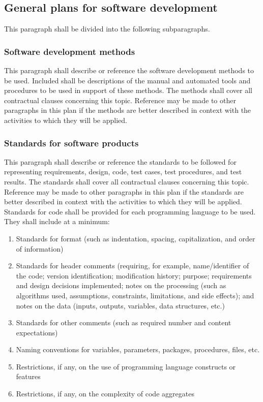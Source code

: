 \subsection{General plans for software development}

This paragraph shall be divided into the following subparagraphs.

\subsubsection{Software development methods}

This paragraph shall describe or reference the software development
methods to be used. Included shall be descriptions of the manual and
automated tools and procedures to be used in support of these methods.
The methods shall cover all contractual clauses concerning this topic.
Reference may be made to other paragraphs in this plan if the methods
are better described in context with the activities to which they will
be applied.

\subsubsection{Standards for software products}

This paragraph shall describe or reference the standards to be followed
for representing requirements, design, code, test cases, test
procedures, and test results. The standards shall cover all contractual
clauses concerning this topic. Reference may be made to other paragraphs
in this plan if the standards are better described in context with the
activities to which they will be applied. Standards for code shall be
provided for each programming language to be used. They shall include at
a minimum:

\begin{enumerate}
\itemsep1pt\parskip0pt
\item
  Standards for format (such as indentation, spacing, capitalization,
  and order of information)
\item
  Standards for header comments (requiring, for example, name/identifier
  of the code; version identification; modification history; purpose;
  requirements and design decisions implemented; notes on the processing
  (such as algorithms used, assumptions, constraints, limitations, and
  side effects); and notes on the data (inputs, outputs, variables, data
  structures, etc.)
\item
  Standards for other comments (such as required number and content
  expectations)
\item
  Naming conventions for variables, parameters, packages, procedures,
  files, etc.
\item
  Restrictions, if any, on the use of programming language constructs or
  features
\item
  Restrictions, if any, on the complexity of code aggregates
\end{enumerate}

